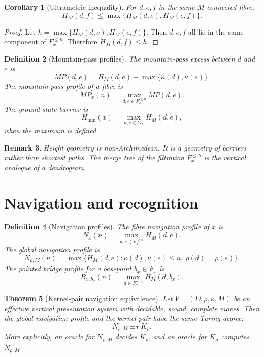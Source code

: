 \documentclass[11pt]{article}
\newtheorem{theorem}{Theorem}[section]
\newtheorem{corollary}[theorem]{Corollary}
\newtheorem{definition}[theorem]{Definition}
\newtheorem{remark}[theorem]{Remark}
\begin{document}
\begin{corollary}[Ultrametric inequality]
For \(d,e,f\) in the same \(M\)-connected fibre,
\[
H_M(d,f)\le\max\{H_M(d,e),H_M(e,f)\}.
\]
\end{corollary}

\begin{proof}
Let \(h=\max\{H_M(d,e),H_M(e,f)\}\).  Then \(d,e,f\) all lie in the same component of \(F_x^{\le h}\).  Therefore \(H_M(d,f)\le h\).
\end{proof}

\begin{definition}[Mountain-pass profiles]
The mountain-pass excess between \(d\) and \(e\) is
\[
MP(d,e)=H_M(d,e)-\max\{\kappa(d),\kappa(e)\}.
\]
The mountain-pass profile of a fibre is
\[
MP_x(n)=\max_{d,e\in F_x^{\le n}}MP(d,e).
\]
The ground-state barrier is
\[
H_{\min}(x)=\max_{d,e\in G_x}H_M(d,e),
\]
when the maximum is defined.
\end{definition}

\begin{remark}
Height geometry is non-Archimedean.  It is a geometry of barriers rather than shortest paths.  The merge tree of the filtration \(F_x^{\le h}\) is the vertical analogue of a dendrogram.
\end{remark}

\section{Navigation and recognition}

\begin{definition}[Navigation profiles]
The fibre navigation profile of \(x\) is
\[
N_x(n)=\max_{d,e\in F_x^{\le n}}H_M(d,e).
\]
The global navigation profile is
\[
N_{\rho,M}(n)=
\max\{H_M(d,e):\kappa(d),\kappa(e)\le n,\ \rho(d)=\rho(e)\}.
\]
The pointed bridge profile for a basepoint \(b_x\in F_x\) is
\[
B_{x,b_x}(n)=\max_{d\in F_x^{\le n}}H_M(d,b_x).
\]
\end{definition}

\begin{theorem}[Kernel-pair navigation equivalence]
Let \(V=(D,\rho,\kappa,M)\) be an effective vertical presentation system with decidable, sound, complete moves.  Then the global navigation profile and the kernel pair have the same Turing degree:
\[
N_{\rho,M}\equiv_T K_\rho.
\]
More explicitly, an oracle for \(N_{\rho,M}\) decides \(K_\rho\), and an oracle for \(K_\rho\) computes \(N_{\rho,M}\).
\end{theorem}
\end{document}
